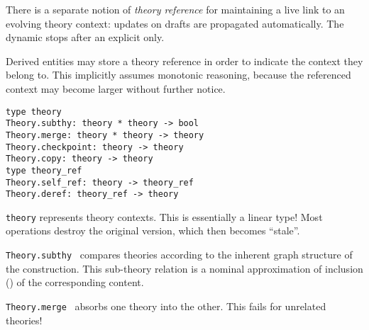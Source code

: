 \begin{isabellebody}
\begin{isamarkuptext}
  \medskip There is a separate notion of \emph{theory reference} for
  maintaining a live link to an evolving theory context: updates on
  drafts are propagated automatically.  The dynamic stops after an
  explicit  only.

  Derived entities may store a theory reference in order to indicate
  the context they belong to.  This implicitly assumes monotonic
  reasoning, because the referenced context may become larger without
  further notice.%
\end{isamarkuptext}%
\isamarkuptrue%
%
\isadelimmlref
%
\endisadelimmlref
%
\isatagmlref
%
\begin{isamarkuptext}%
\begin{mldecls}
  \verb|type theory| \\
  \verb|Theory.subthy: theory * theory -> bool| \\
  \verb|Theory.merge: theory * theory -> theory| \\
  \verb|Theory.checkpoint: theory -> theory| \\
  \verb|Theory.copy: theory -> theory| \\[1ex]
  \verb|type theory_ref| \\
  \verb|Theory.self_ref: theory -> theory_ref| \\
  \verb|Theory.deref: theory_ref -> theory| \\
  \end{mldecls}

  \begin{description}

  \item \verb|theory| represents theory contexts.  This is
  essentially a linear type!  Most operations destroy the original
  version, which then becomes ``stale''.

  \item \verb|Theory.subthy|~
  compares theories according to the inherent graph structure of the
  construction.  This sub-theory relation is a nominal approximation
  of inclusion (\isa{{\isasymsubseteq}}) of the corresponding content.

  \item \verb|Theory.merge|~
  absorbs one theory into the other.  This fails for unrelated
  theories!


\end{description}
\end{isamarkuptext}
\end{isabellebody}
